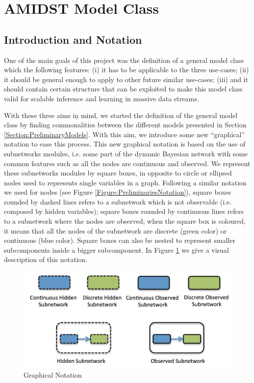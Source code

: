 \section{AMIDST Model Class}

\subsection{Introduction  and Notation}

One of the main goals of this project was the definition of a general model class which the following features: (i) it has to be applicable to the three use-cases; (ii) it should be general enough to apply to other future similar use-cases;  (iii) and it should contain certain structure that can be exploited to make this model class valid for scalable inference and learning in massive data streams. 

With these three aims in mind,  we started the definition of the general model class by finding commonalities between the different models presented in Section \ref{Section:PreliminaryModels}.  With this aim, we  introduce some new ``graphical'' notation to ease this process. This new graphical notation is based on the use of subnetworks modules, i.e. some part of the dynamic Bayesian network with some common features such as all the nodes are continuous and observed.  We represent these subnetworks modules by square boxes, in opposite to circle or ellipsed nodes used to represents single variables in a graph. Following a similar notation we used for nodes (see Figure \ref{Figure:PreliminariesNotation}), square boxes rounded by dashed lines refers to a subnetwork which is not observable (i.e. composed by hidden variables); square boxes rounded by continuous lines refers to a subnetwork where the nodes are observed; when the square box is coloured, it means that all the nodes of the subnetwork are discrete (green color) or continuous (blue color). Square boxes can also be nested to represent smaller subcomponents inside a bigger subcomponent. In Figure \ref{Figure:ModelClass:Notation} we give a visual description of this notation. 

\begin{figure}
\begin{center}
\includegraphics[scale=0.4]{./figures/ModelClass0}
\caption{\label{Figure:ModelClass:Notation} Graphical Notation}
\end{center}
\end{figure}

